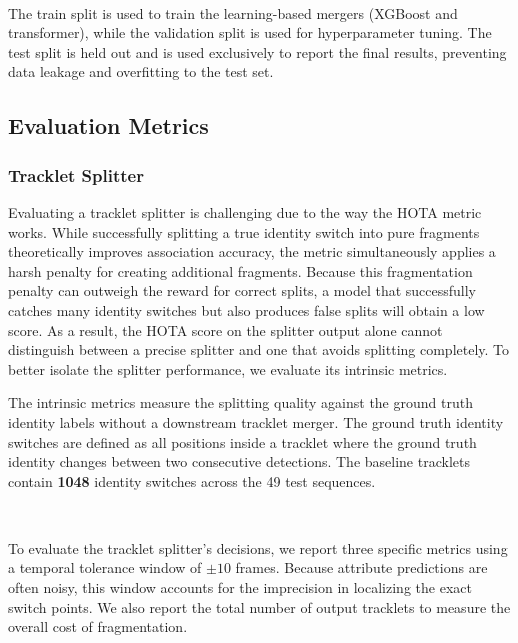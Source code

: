 \

The train split is used to train the learning-based mergers (XGBoost and transformer), while the validation split is used for hyperparameter tuning. The test split is held out and is used exclusively to report the final results, preventing data leakage and overfitting to the test set.




\subsection{Evaluation Metrics}\label{sec:evaluation_metrics}

\subsubsection{Tracklet Splitter}
Evaluating a tracklet splitter is challenging due to the way the HOTA metric works. While successfully splitting a true identity switch into pure fragments theoretically improves association accuracy, the metric simultaneously applies a harsh penalty for creating additional fragments. Because this fragmentation penalty can outweigh the reward for correct splits, a model that successfully catches many identity switches but also produces false splits will obtain a low score. As a result, the HOTA score on  the splitter output alone cannot distinguish between a precise splitter and one that avoids splitting completely. To better isolate the splitter performance, we evaluate its intrinsic metrics.


The intrinsic metrics measure the splitting quality against the ground truth identity labels without a downstream tracklet merger. The ground truth identity switches are defined as all positions inside a  tracklet where the ground truth identity changes between two consecutive detections. The baseline tracklets contain \textbf{1048} identity switches across the 49 test sequences.

\

To evaluate the tracklet splitter's decisions, we report three specific metrics using a temporal tolerance window of $\pm 10$ frames. Because attribute predictions are often noisy, this window accounts for the imprecision in localizing the exact switch points. We also report the total number of output tracklets to measure the overall cost of fragmentation.

